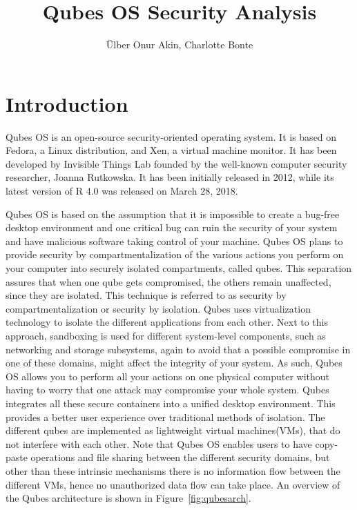 \documentclass[runningheads,a4paper]{article}
\begin{document}
\title{Qubes OS Security Analysis}

\author{\"Ulber Onur Akin, Charlotte Bonte}

\maketitle

\tableofcontents

\newpage
\section{Introduction}
Qubes OS is an open-source security-oriented operating system.  It is
based on Fedora, a Linux distribution, and Xen, a virtual machine
monitor.  It has been developed by Invisible Things Lab founded by the
well-known computer security researcher, Joanna Rutkowska. It has been
initially released in 2012, while its latest version of R 4.0 was
released on March 28, 2018.

Qubes OS is based on the assumption that it is impossible to create a
bug-free desktop environment and one critical bug can ruin the
security of your system and have malicious software taking control
of your machine. Qubes OS plans to provide security by
compartmentalization of the various actions you perform on your
computer into securely isolated compartments, called qubes.  This
separation assures that when one qube gets compromised, the others
remain unaffected, since they are isolated.  This technique is
referred to as security by compartmentalization or security by
isolation.  Qubes uses virtualization technology to isolate the
different applications from each other. Next to this approach,
sandboxing is used for different system-level components, such as
networking and storage subsystems, again to avoid that a possible
compromise in one of these domains, might affect the integrity of your
system. As such, Qubes OS allows you to perform all your actions on
one physical computer without having to worry that one attack may
compromise your whole system. Qubes integrates all these secure
containers into a unified desktop environment. This provides a better
user experience over traditional methods of isolation. The different
qubes are implemented as lightweight virtual machines(VMs), that do
not interfere with each other.  Note that Qubes OS enables users to
have copy-paste operations and file sharing between the different
security domains, but other than these intrinsic mechanisms there is
no information flow between the different VMs, hence no unauthorized
data flow can take place. An overview of the Qubes architecture is
shown in Figure~\ref{fig:qubesarch}.
\end{document}
